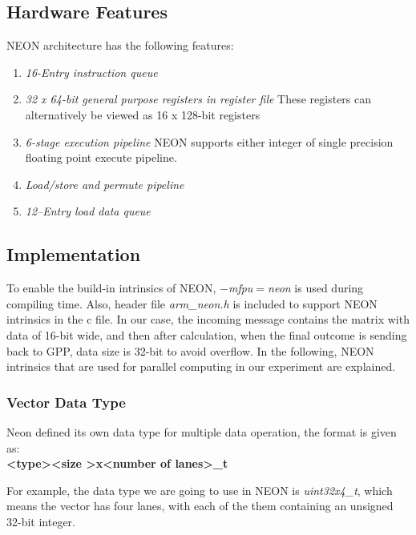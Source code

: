 \subsection{Hardware Features}
NEON architecture has the following features\cite{hardware}:
\begin{enumerate}
\item \emph{16-Entry instruction queue}
\item \emph{32 x 64-bit general purpose registers in register file}
These registers can alternatively be viewed as 16 x 128-bit registers
\item \emph{6-stage execution pipeline}
NEON supports either integer of single precision floating point execute pipeline.
\item \emph{Load/store and permute pipeline}
\item \emph{12–Entry load data queue}
\end{enumerate}

\subsection{Implementation}
To enable the build-in intrinsics of NEON, 
\emph{$-$mfpu$=$neon}\cite{ARMoptions} is used during compiling time.
Also, header file \emph{arm\_neon.h} is included 
to support NEON intrinsics in the c file.
In our case, the incoming message contains the matrix with data of 16-bit wide, 
and then after calculation, when the final outcome is sending back to GPP, data size is 32-bit to avoid overflow.
In the following, NEON intrinsics that are used for parallel computing in our experiment are explained.
\subsubsection{Vector Data Type}
Neon defined its own data type\cite{DataType} for multiple data operation, the format is given as:
~\\ 
\textbf{ \textless type\textgreater \textless size \textgreater x\textless number of lanes\textgreater\_t}

For example, the data type we are going to use in NEON is \emph{uint32x4\_t}, 
which means the vector has four lanes, 
with each of the them containing an unsigned 32-bit integer. 
